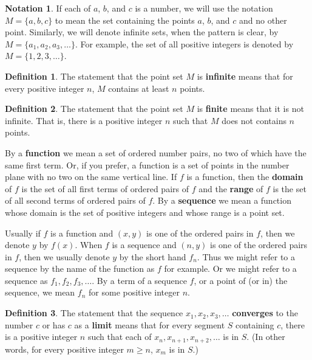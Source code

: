 \documentclass{article}
\theoremstyle{definition}
\newtheorem{definition}{Definition}
\newtheorem{notation}{Notation}
\begin{document}
\begin{notation}
If each of $a$, $b$, and $c$ is a number, we will use the notation $M = \{a, b, c\}$ to mean the set containing the points $a$, $b$, and $c$ and no other point. Similarly, we will denote infinite sets, when the pattern is clear, by $M = \{a_1, a_2, a_3, \dots\}$. For example, the set of all positive integers is denoted by $M = \{1, 2, 3, \dots\}$.
\end{notation}

\begin{definition}
The statement that the point set $M$ is \textbf{infinite} means that for every positive integer $n$, $M$ contains at least $n$ points.
\end{definition}

\begin{definition}
The statement that the point set $M$ is \textbf{finite} means that it is not infinite. That is, there is a positive integer $n$ such that $M$ does not contains $n$ points.
\end{definition}

By a \textbf{function} we mean a set of ordered number pairs, no two of which have the same first term. Or, if you prefer, a function is a set of points in the number plane with no two on the same vertical line. If $f$ is a function, then the \textbf{domain} of $f$ is the set of all first terms of ordered pairs of $f$ and the \textbf{range} of $f$ is the set of all second terms of ordered pairs of $f$. By a \textbf{sequence} we mean a function whose domain is the set of positive integers and whose range is a point set.

Usually if $f$ is a function and $(x, y)$ is one of the ordered pairs in $f$, then we denote $y$ by $f(x)$. When $f$ is a sequence and $(n, y)$ is one of the ordered pairs in $f$, then we usually denote $y$ by the short hand $f_n$. Thus we might refer to a sequence by the name of the function as $f$ for example. Or we might refer to a sequence as $f_1, f_2, f_3, \dots$. By a term of a sequence $f$, or a point of (or in) the sequence, we mean $f_n$ for some positive integer $n$.

\begin{definition}
The statement that the sequence $x_1, x_2, x_3, \dots$ \textbf{converges} to the number $c$ or has $c$ as a \textbf{limit} means that for every segment $S$ containing $c$, there is a positive integer $n$ such that each of $x_n, x_{n+1}, x_{n+2}, \dots$ is in $S$. (In other words, for every positive integer $m \geq n$, $x_m$ is in $S$.)
\end{definition}
\end{document}
